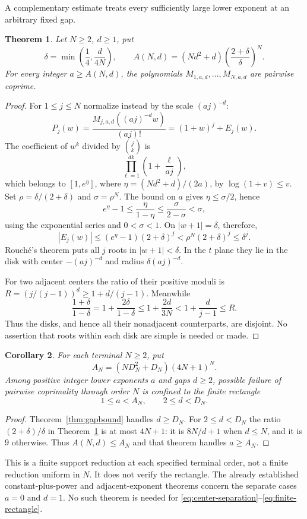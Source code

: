 \documentclass[11pt]{article}
\newtheorem{theorem}{Theorem}
\newtheorem{corollary}[theorem]{Corollary}
\begin{document}
A complementary estimate treats every sufficiently large lower
exponent at an arbitrary fixed gap.
\begin{theorem}\label{thm:lowerbound}
Let $N\ge2$, $d\ge1$, put
\[
 \delta=\min\left(\frac14,\frac{d}{4N}\right),\qquad
 A(N,d)=(Nd^2+d)\left(\frac{2+\delta}{\delta}\right)^N.
\]
For every integer $a\ge A(N,d)$, the polynomials
$M_{1,a,d},\ldots,M_{N,a,d}$ are pairwise coprime.
\end{theorem}
\begin{proof}
For $1\le j\le N$ normalize instead by the scale $(aj)^{-d}$:
\[
 P_j(w)=\frac{M_{j,a,d}((aj)^{-d}w)}{(aj)!}
       =(1+w)^j+E_j(w).
\]
The coefficient of $w^k$ divided by $\binom jk$ is
\[
 \prod_{\ell=1}^{dk}\left(1+\frac{\ell}{aj}\right),
\]
which belongs to $[1,e^\eta]$, where
$\eta=(Nd^2+d)/(2a)$, by $\log(1+v)\le v$.
Set $\rho=\delta/(2+\delta)$ and $\sigma=\rho^N$.
The bound on $a$ gives $\eta\le\sigma/2$, hence
\[
 e^\eta-1\le\frac{\eta}{1-\eta}
 \le\frac{\sigma}{2-\sigma}<\sigma,
\]
using the exponential series and $0<\sigma<1$.
On $|w+1|=\delta$, therefore,
\[
 |E_j(w)|\le(e^\eta-1)(2+\delta)^j
 <\rho^N(2+\delta)^j\le\delta^j.
\]
Rouch\'e's theorem puts all $j$ roots in $|w+1|<\delta$.
In the $t$ plane they lie in the disk with center $-(aj)^{-d}$
and radius $\delta(aj)^{-d}$.

For two adjacent centers the ratio of their positive moduli is
$R=(j/(j-1))^d\ge1+d/(j-1)$.
Meanwhile
\[
 \frac{1+\delta}{1-\delta}
 =1+\frac{2\delta}{1-\delta}
 \le1+\frac{2d}{3N}<1+\frac d{j-1}\le R.
\]
Thus the disks, and hence all their nonadjacent counterparts, are
disjoint. No assertion that roots within each disk are simple is
needed or made.
\end{proof}

\begin{corollary}\label{cor:rectangle}
For each terminal $N\ge2$, put
\[
 A_N=(ND_N^2+D_N)(4N+1)^N.
\]
Among positive integer lower exponents $a$ and gaps $d\ge2$,
possible failure of pairwise coprimality through order $N$ is confined
to the finite rectangle
\[
 1\le a<A_N,\qquad 2\le d<D_N.                             \tag{5}\label{eq:finite-rectangle}
\]
\end{corollary}
\begin{proof}
Theorem~\ref{thm:gapbound} handles $d\ge D_N$.
For $2\le d<D_N$ the ratio $(2+\delta)/\delta$ in
Theorem~\ref{thm:lowerbound} is at most $4N+1$:
it is $8N/d+1$ when $d\le N$, and it is $9$ otherwise.
Thus $A(N,d)\le A_N$ and that theorem handles $a\ge A_N$.
\end{proof}
This is a finite support reduction at each specified terminal order,
not a finite reduction uniform in $N$. It does not verify the rectangle.
The already established constant-plus-power and adjacent-exponent
theorems concern the separate cases $a=0$ and $d=1$.
No such theorem is needed for \eqref{eq:center-separation}--\eqref{eq:finite-rectangle}.
\end{document}
